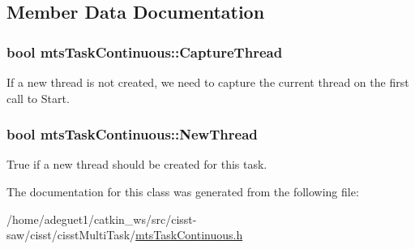 \subsection{Member Data Documentation}
\hypertarget{classmts_task_continuous_ae820327812640e231d44a4b2ad6b148e}{
\subsubsection[{Capture\-Thread}]{\setlength{\rightskip}{0pt plus 5cm}bool mts\-Task\-Continuous\-::\-Capture\-Thread\hspace{0.3cm}{\ttfamily [protected]}}}\label{classmts_task_continuous_ae820327812640e231d44a4b2ad6b148e}
If a new thread is not created, we need to capture the current thread on the first call to Start. \hypertarget{classmts_task_continuous_a10a9569559a59e62d28ab29c6fc7636c}{
\subsubsection[{New\-Thread}]{\setlength{\rightskip}{0pt plus 5cm}bool mts\-Task\-Continuous\-::\-New\-Thread\hspace{0.3cm}{\ttfamily [protected]}}}\label{classmts_task_continuous_a10a9569559a59e62d28ab29c6fc7636c}
True if a new thread should be created for this task. 

The documentation for this class was generated from the following file\-:\begin{DoxyCompactItemize}
\item 
/home/adeguet1/catkin\-\_\-ws/src/cisst-\/saw/cisst/cisst\-Multi\-Task/\hyperlink{mts_task_continuous_8h}{mts\-Task\-Continuous.\-h}\end{DoxyCompactItemize}

